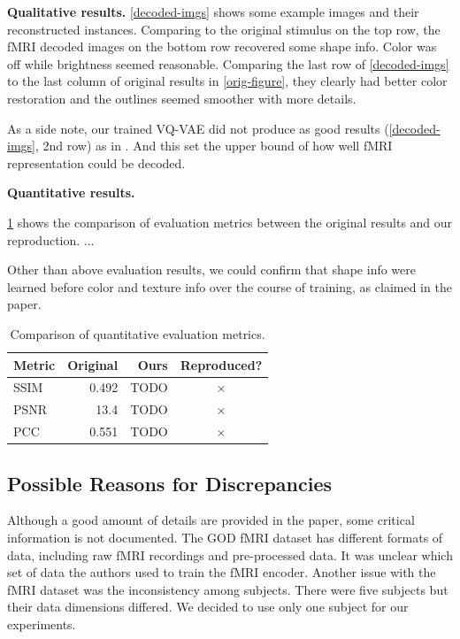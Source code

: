 \documentclass{article}
\theoremstyle{plain}
\theoremstyle{definition}
\theoremstyle{remark}
\begin{document}
\textbf{Qualitative results.} \cref{decoded-imgs} shows some example images and their reconstructed instances. Comparing to the original stimulus on the top row, the fMRI decoded  images on the bottom row recovered some shape info. Color was off while brightness seemed reasonable.
Comparing the last row of \cref{decoded-imgs} to the last column of original results in \cref{orig-figure}, they clearly had better color restoration and the outlines seemed smoother with more details.


As a side note, our trained VQ-VAE did not produce as good results (\cref{decoded-imgs}, 2nd row) as in \cite{oordNeuralDiscreteRepresentation2018}. And this set the upper bound of how well fMRI representation could be decoded.


\textbf{Quantitative results.}
\todo 

\cref{metric-table} shows the comparison of evaluation metrics between the original results and our reproduction. ...

\medskip

Other than above evaluation results, we could confirm that shape info were learned before color and texture info over the course of training, as claimed in the paper.


\begin{table}[b]
\caption{Comparison of quantitative evaluation metrics.}
\label{metric-table}
\vskip 0.15in
\begin{center}
\begin{small}
\begin{sc}
\begin{tabular}{lrrc}
\toprule
Metric & Original & Ours & Reproduced? \\
\midrule
SSIM    & 0.492 & TODO & $\times$ \\
PSNR    & 13.4 &  TODO & $\times$ \\
PCC     & 0.551 & TODO & $\times$ \\
\bottomrule
\end{tabular}
\end{sc}
\end{small}
\end{center}
\vskip -0.1in
\end{table}

\subsection{Possible Reasons for Discrepancies}
Although a good amount of details are provided in the paper, some critical information is not documented. The GOD fMRI dataset \cite{horikawa2016} has different formats of data, including raw fMRI recordings and pre-processed data. It was unclear which set of data the authors used to train the fMRI encoder. Another issue with the fMRI dataset was the inconsistency among subjects. There were five subjects but their data dimensions differed. We decided to use only one subject for our experiments.
\end{document}
